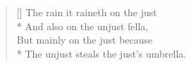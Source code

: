 \documentclass[MAIN]{subfiles}
\begin{document}
\settowidth{\versewidth}{The rain it raineth on the just}
\begin{verse}[\versewidth]
The rain it raineth on the just\\*
\vin And also on the unjust fella,\\
But mainly on the just because\\*
\vin The unjust steals the just's umbrella.
\end{verse}
\end{document}
